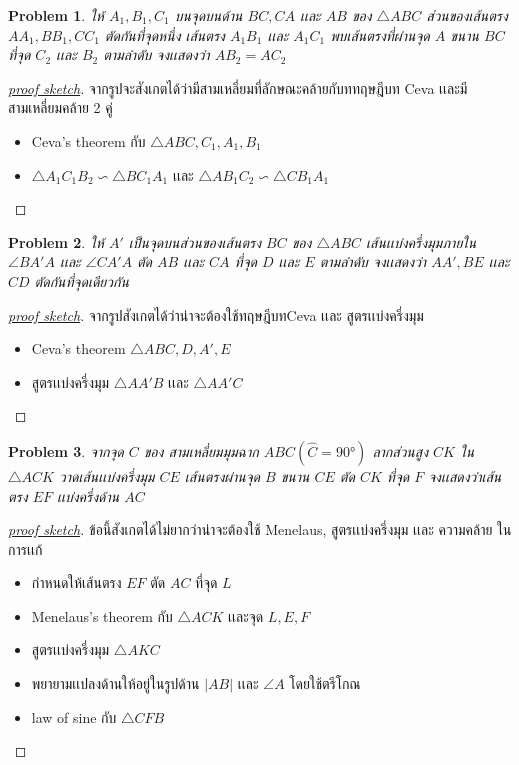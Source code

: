 \documentclass[a4paper,12pt]{article}
\newtheorem{problem}{Problem}[section]
\begin{document}
		\begin{problem}
			ให้ $A_1,B_1,C_1$ บนจุดบนด้าน $BC, CA$ เเละ $AB$ ของ 
			$\bigtriangleup{ABC}$ ส่วนของเส้นตรง $AA_1, BB_1, CC_1$ ตัดกันที่จุดหนึ่ง เส้นตรง $A_1B_1$ เเละ $A_1C_1$ พบเส้นตรงที่ผ่านจุด $A$ ขนาน $BC$ ที่จุด $C_2$ เเละ $B_2$ ตามลำดับ จงเเสดงว่า $AB_2 = AC_2$
		\end{problem}
		\begin{proof}[\underline{proof sketch}]
			จากรูปจะสังเกตได้ว่ามีสามเหลี่ยมที่ลักษณะคล้ายกับททฤษฎีบท Ceva เเละมีสามเหลี่ยมคล้าย 2 คู่
			\begin{itemize}
				\item  Ceva's theorem กับ $\bigtriangleup{ABC} ,C_1, A_1, B_1$
				\item $\bigtriangleup{A_1C_1B_2} \backsim \bigtriangleup{BC_1A_1}$ เเละ $\bigtriangleup{AB_1C_2} \backsim \bigtriangleup{CB_1A_1}$
			\end{itemize}
		\end{proof}
		\begin{problem}
			ให้ $A'$ เป็นจุดบนส่วนของเส้นตรง $BC$ ของ $\bigtriangleup{ABC}$ เส้นเเบ่งครึ่งมุมภายใน $\angle{BA'A}$ เเละ $\angle{CA'A}$ ตัด $AB$ เเละ $CA$ ที่จุด $D$ เเละ $E$ ตามลำดับ จงเเสดงว่า $AA', BE$ เเละ $CD$ ตัดกันที่จุดเดียวกัน
		\end{problem}
		\begin{proof}[\underline{proof sketch}] จากรูปสังเกตได้ว่าน่าจะต้องใช้ทฤษฎีบทCeva เเละ สูตรเเบ่งครึ่งมุม
			\begin{itemize}
				\item Ceva's theorem $\bigtriangleup{ABC}, D, A', E$
				\item สูตรเเบ่งครึ่งมุม $\bigtriangleup{AA'B}$ เเละ $\bigtriangleup{AA'C}$
			\end{itemize}
			
		\end{proof}
		\newpage
		\begin{problem}
			จากจุด $C$ ของ สามเหลี่ยมมุมฉาก $ABC (\hat{C}=\ang{90})$ ลากส่วนสูง $CK$ ใน $\bigtriangleup{ACK}$ วาดเส้นเเบ่งครึ่งมุม $CE$ เส้นตรงผ่านจุด $B$ ขนาน $CE$ ตัด $CK$ ที่จุด $F$ จงเเสดงว่าเส้นตรง $EF$ เเบ่งครึ่งด้าน $AC$ 
		\end{problem}
	\begin{proof}[\underline{proof sketch}]
		ข้อนี้สังเกตได้ไม่ยากว่าน่าจะต้องใช้ Menelaus, สูตรเเบ่งครึ่งมุม เเละ ความคล้าย ในการเเก้
		\begin{itemize}
			\item กำหนดให้เส้นตรง $EF$ ตัด $AC$ ที่จุด $L$
			\item Menelaus's theorem กับ  $\bigtriangleup{ACK}$ เเละจุด $L,E,F $
			\item สูตรเเบ่งครึ่งมุม $\bigtriangleup{AKC}$
			\item พยายามเเปลงด้านให้อยู่ในรูปด้าน $|AB|$ เเละ $\angle{A}$ โดยใช้ตรีโกณ
			\item law of sine กับ $\bigtriangleup{CFB}$
		\end{itemize}
	\end{proof}
		
\end{document}
